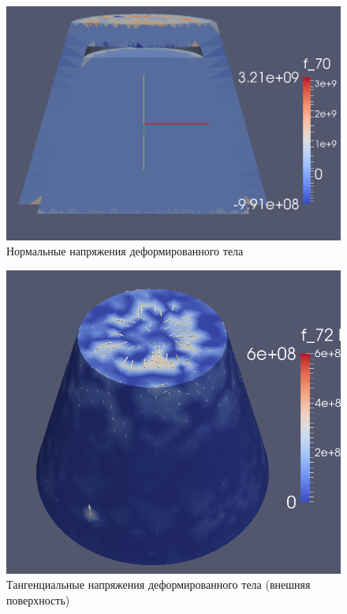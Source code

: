 \documentclass[a4paper, 14pt]{extreport}
\begin{document}
\begin{figure}[H]
	\center
	\includegraphics[scale=0.35]{pictures/result_push_normal_stress_slice.png}
	\caption{Нормальные напряжения деформированного тела}
	\label{fig: result_push_normal_stress_slice}
\end{figure}

\begin{figure}[H]
	\center
	\includegraphics[scale=0.45]{pictures/result_push_shear_stress_full.png}
	\caption{Тангенциальные напряжения деформированного тела (внешняя поверхность)}
	\label{fig: result_push_shear_stress_full}
\end{figure}
\end{document}
